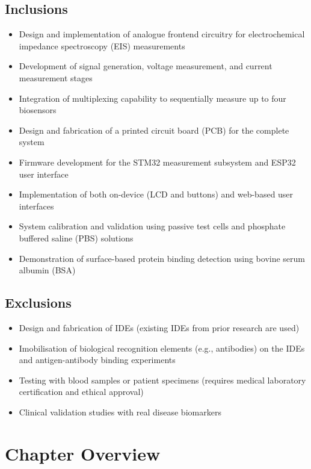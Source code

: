 \subsection{Inclusions}
\begin{itemize}
    \item Design and implementation of analogue frontend circuitry for electrochemical impedance spectroscopy (EIS) measurements
    \item Development of signal generation, voltage measurement, and current measurement stages
    \item Integration of multiplexing capability to sequentially measure up to four biosensors
    \item Design and fabrication of a printed circuit board (PCB) for the complete system
    \item Firmware development for the STM32 measurement subsystem and ESP32 user interface
    \item Implementation of both on-device (LCD and buttons) and web-based user interfaces
    \item System calibration and validation using passive test cells and phosphate buffered saline (PBS) solutions
    \item Demonstration of surface-based protein binding detection using bovine serum albumin (BSA)
\end{itemize}

\subsection{Exclusions}
\begin{itemize}
    \item Design and fabrication of \acp{IDE} (existing \acp{IDE} from prior research are used)
    \item Imobilisation of biological recognition elements (e.g., antibodies) on the \acp{IDE} and antigen-antibody binding experiments
    \item Testing with blood samples or patient specimens (requires medical laboratory certification and ethical approval)
    \item Clinical validation studies with real disease biomarkers
\end{itemize}

\section{Chapter Overview}

